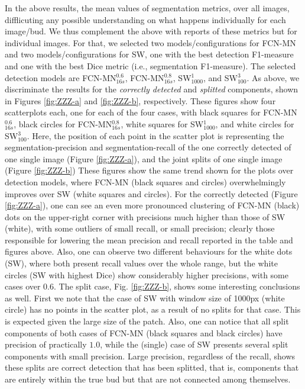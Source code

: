 \documentclass[a4paper,authoryear,review]{elsarticle}
\begin{document}
In the above results, the mean values of segmentation metrics, over all images, difflicuting any possible understanding on what happens individually for each image/bud. We thus complement the above with reports of these metrics but for individual images. For that, we selected two models/configurations for FCN-MN and two models/configurations for SW, one with the best detection F1-measure  and one with the best Dice metric (i.e., segmentation F1-measure). The selected detection models are FCN-MN$_{16s}^{0.6}$,  FCN-MN$_{16s}^{0.8}$, SW$_{1000}^{1}$, and SW$_{100}^{3}$. 
%
As above, we discriminate the results for the \emph{correctly detected} and \emph{splitted} components, shown in Figures \ref{fig:ZZZ-a} and \ref{fig:ZZZ-b},  respectively. These figures show four scatterplots each, one for each of the four cases, with black squares for FCN-MN$_{16s}^{0.6}$, black circles for  FCN-MN$_{16s}^{0.8}$, white squares for SW$_{1000}^{1}$, and white circles for SW$_{100}^{3}$.  Here, the position of each point in the scatter plot is representing the segmentation-precision and segmentation-recall of the one correctly detected of one single image (Figure \ref{fig:ZZZ-a}), and the joint splits of one single image (Figure \ref{fig:ZZZ-b})
%
These figures show the same trend shown for the plots over detection models, where FCN-MN (black squares and circles) overwhelmingly improves over SW (white squares and circles). For the correctly detected (Figure \ref{fig:ZZZ-a}),  one can see an even more pronounced clustering of FCN-MN (black) dots on the upper-right corner with precisions much higher than those of SW (white), with some outliers of small recall, or small precision; clearly those responsible for lowering the mean precision and recall reported in the table and figures above. Also, one can observe two different behaviours for the white dots (SW), where both present recall values over the whole range, but the white circles (SW with highest Dice) show considerably higher precisions, with some cases over $0.6$.  
%
The split case, Fig. \ref{fig:ZZZ-b},  shows some interesting conclusions as well. First we note that the case of SW with window size of 1000px (white circle) has no points in the scatter plot, as a result of no splits for that case. This is expected given the large size of the patch. Also, one can notice that all split components of both cases of FCN-MN (black squares and black circles)  have precision of practically $1.0$, while the (single) case of SW presents several split components with small precision. Large precision, regardless of the recall, shows these splits are correct detection that has been splitted, that is, components that are entirely within the true bud but that are not connected among themselves. 
\end{document}
